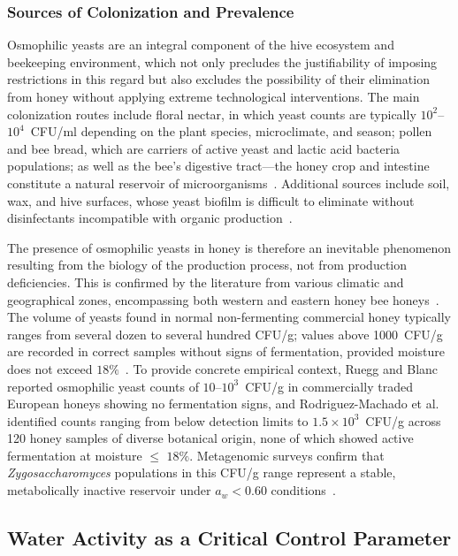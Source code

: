 \documentclass[foods,review,accept,pdftex,moreauthors]{Definitions/mdpi}
\begin{document}
{\subsubsection{Sources of Colonization and Prevalence}
Osmophilic yeasts are an integral component of the hive ecosystem
and beekeeping environment, which not only precludes the
justifiability of imposing restrictions in this regard but also
excludes the possibility of their elimination from honey without
applying extreme technological interventions. The main colonization
routes include floral nectar, in which yeast counts are typically
$10^2$--$10^4$~CFU/ml depending on the plant species, microclimate,
and season; pollen and bee bread, which are carriers of active
yeast and lactic acid bacteria populations; as well as the bee's
digestive tract---the honey crop and intestine constitute a natural
reservoir of microorganisms~\cite{alwaili2012}.
Additional sources include soil, wax, and hive surfaces, whose yeast
biofilm is difficult to eliminate without disinfectants incompatible
with organic production~\cite{alwaili2012}.

The presence of osmophilic yeasts in honey is therefore an inevitable
phenomenon resulting from the biology of the production process,
not from production deficiencies. This is confirmed by the literature
from various climatic and geographical zones, encompassing both
western and eastern honey bee
honeys~\cite{yeastbiodiversity2025}.
The volume of yeasts found in normal non-fermenting commercial
honey typically ranges from several dozen to several hundred CFU/g;
values above 1000~CFU/g are recorded in correct samples without
signs of fermentation, provided moisture does not exceed
$18\%$~\cite{analytica2020}.
{To provide concrete empirical context, Ruegg and Blanc~\cite{ruegg1981}
reported osmophilic yeast counts of $10$--$10^3$~CFU/g in commercially
traded European honeys showing no fermentation signs, and Rodrigue\-z-Machado
et al.~\cite{rodriguezmachado2024} identified counts ranging from below
detection limits to $1.5 \times 10^3$~CFU/g across 120 honey samples
of diverse botanical origin, none of which showed active fermentation
at moisture $\leq$ $18\%$. Metagenomic surveys confirm that
\textit{Zygosaccharomyces} populations in this CFU/g range represent
a stable, metabolically inactive reservoir under $a_w < 0.60$
conditions~\cite{yeastbiodiversity2025}.}



\subsection{Water Activity as a Critical Control Parameter}


}
\end{document}
